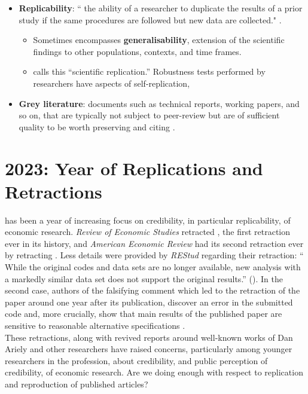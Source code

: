 \documentclass[11pt]{article}
\begin{document}
\begin{itemize}
	\item \textbf{Replicability}: “ the ability of a researcher to duplicate the results of a prior study if the
	same procedures are followed but new data are collected." \cite{bollen2015social}.
	\begin{itemize}
		\item Sometimes encompasses \textbf{generalisability}, extension of the scientific findings to other populations, contexts, and time frames. \cite{vilhuber2020reproducibility}
		\item \cite{hamermesh2007replication} calls this “scientific replication.” Robustness tests performed by researchers have aspects of self-replication,
	\end{itemize}
	\item \textbf{Grey literature}:	documents such as technical reports, working papers, and so on, that are typically not subject to peer-review but are of sufficient quality to be worth preserving and citing \cite{vilhuber2020reproducibility}. 
	
	
\end{itemize}


\newpage
\section{2023: Year of Replications and Retractions}

 has been a year of increasing focus on credibility, in particular replicability, of economic research. \textit{Review of Economic Studies} retracted \cite{giuliano2014retracted}, the first retraction ever in its history, and \textit{American Economic Review} had its second retraction ever by retracting \cite{boissel2022dividend}. Less details were provided by \textit{REStud} regarding their retraction: `` While the original codes and data sets are no longer available, new analysis with a markedly similar data set does not support the original results.'' (\cite{restud2023retrac}). In the second case, authors of the falsifying comment which led to the retraction of the paper around one year after its publication, discover an error in the submitted code and, more crucially, show that main results of the published paper are sensitive to reasonable alternative specifications \cite{bach2023dividend}.\\

These retractions, along with revived reports around well-known works of Dan Ariely and other researchers have raised concerns, particularly among younger researchers in the profession, about credibility, and public perception of credibility, of economic research. Are we doing enough with respect to replication and reproduction of published articles?\\
\end{document}
